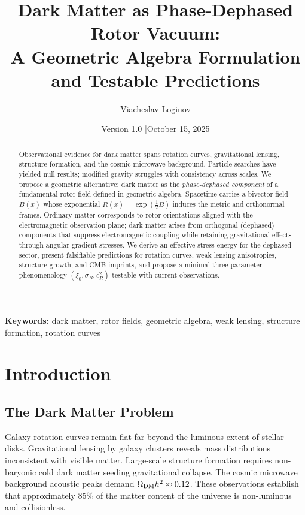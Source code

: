 \documentclass[11pt,a4paper]{article}
\title{\textbf{Dark Matter as Phase-Dephased Rotor Vacuum:\\
A Geometric Algebra Formulation and Testable Predictions}}
\author[1]{Viacheslav Loginov}
\affil[1]{Kyiv, Ukraine\\ \texttt{barthez.slavik@gmail.com}}
\date{\small Version 1.0 \quad|\quad October 15, 2025}
\numberwithin{equation}{section}
\theoremstyle{plain}
\theoremstyle{definition}
\theoremstyle{remark}
\begin{document}
\maketitle

\begin{abstract}
\noindent
Observational evidence for dark matter spans rotation curves, gravitational lensing, structure formation, and the cosmic microwave background. Particle searches have yielded null results; modified gravity struggles with consistency across scales. We propose a geometric alternative: dark matter as the \emph{phase-dephased component} of a fundamental rotor field defined in geometric algebra. Spacetime carries a bivector field $B(x)$ whose exponential $R(x)=\exp(\tfrac12 B)$ induces the metric and orthonormal frames. Ordinary matter corresponds to rotor orientations aligned with the electromagnetic observation plane; dark matter arises from orthogonal (dephased) components that suppress electromagnetic coupling while retaining gravitational effects through angular-gradient stresses. We derive an effective stress-energy for the dephased sector, present falsifiable predictions for rotation curves, weak lensing anisotropies, structure growth, and CMB imprints, and propose a minimal three-parameter phenomenology $(\xi_0,\sigma_B,c_R^2)$ testable with current observations.
\end{abstract}

\noindent\textbf{Keywords:} dark matter, rotor fields, geometric algebra, weak lensing, structure formation, rotation curves

\vspace{1em}

\section{Introduction}\label{sec:intro}

\subsection{The Dark Matter Problem}

Galaxy rotation curves remain flat far beyond the luminous extent of stellar disks. Gravitational lensing by galaxy clusters reveals mass distributions inconsistent with visible matter. Large-scale structure formation requires non-baryonic cold dark matter seeding gravitational collapse. The cosmic microwave background acoustic peaks demand $\Omega_{\rm DM} h^2 \approx 0.12$. These observations establish that approximately 85\% of the matter content of the universe is non-luminous and collisionless.
\end{document}
